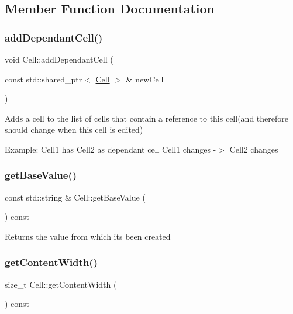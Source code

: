\subsection{Member Function Documentation}
\mbox{\label{classCell_afceadbac4f71834ee2c0add80a3c36fb}} 
\subsubsection{\texorpdfstring{add\+Dependant\+Cell()}{addDependantCell()}}
{\footnotesize\ttfamily void Cell\+::add\+Dependant\+Cell (\begin{DoxyParamCaption}\item[{const std\+::shared\+\_\+ptr$<$ \hyperlink{classCell}{Cell} $>$ \&}]{new\+Cell }\end{DoxyParamCaption})}

Adds a cell to the list of cells that contain a reference to this cell(and therefore should change when this cell is edited)

Example\+: Cell1 has Cell2 as dependant cell Cell1 changes -\/$>$ Cell2 changes \mbox{\label{classCell_a1023dbb5f0feb3990f9c8742a53d42d5}} 
\subsubsection{\texorpdfstring{get\+Base\+Value()}{getBaseValue()}}
{\footnotesize\ttfamily const std\+::string \& Cell\+::get\+Base\+Value (\begin{DoxyParamCaption}{ }\end{DoxyParamCaption}) const}

Returns the value from which it\textquotesingle{}s been created \mbox{\label{classCell_ace29a526d062529ece27df47b2e11461}} 
\subsubsection{\texorpdfstring{get\+Content\+Width()}{getContentWidth()}}
{\footnotesize\ttfamily size\+\_\+t Cell\+::get\+Content\+Width (\begin{DoxyParamCaption}{ }\end{DoxyParamCaption}) const}

